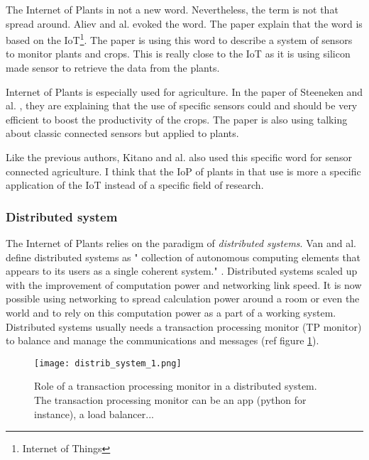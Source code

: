 The Internet of Plants in not a new word. Nevertheless, the term is not that spread around. Aliev and al. \cite{alievInternetPlantsApplication2018} evoked the word. The paper explain that the word is based on the IoT\footnote{Internet of Things}. The paper is using this word to describe a system of sensors to monitor plants and crops. This is really close to the IoT as it is using silicon made sensor to retrieve the data from the plants.

Internet of Plants is especially used for agriculture. In the paper of Steeneken and al. \cite{steenekenSensorsAgricultureInternet2023}, they are explaining that the use of specific sensors could and should be very efficient to boost the productivity of the crops.
The paper is also using talking about classic connected sensors but applied to plants.

Like the previous authors, Kitano and al. \cite{kitanoInternetPlantsIoP2022} also used this specific word for sensor connected agriculture. I think that the IoP of plants in that use is more a specific application of the IoT instead of a specific field of research.

\subsubsection{Distributed system}

The Internet of Plants relies on the paradigm of \textit{distributed systems}. Van and al. define distributed systems as " collection of autonomous computing elements that appears to its users as a single coherent system." \cite{steenDistributedSystems2017}.
Distributed systems scaled up with the improvement of computation power and networking link speed. It is now possible using networking to spread calculation power around a room or even the world and to rely on this computation power as a part of a working system. Distributed systems usually needs a transaction processing monitor (TP monitor) to balance and manage the communications and messages (ref figure \ref{fig:distrib_system_1}).

\begin{figure}[h!]
    \centering
    \texttt{[image: distrib\_system\_1.png]}
    \caption{Role of a transaction processing monitor in a distributed system. The transaction processing monitor can be an app (python for instance), a load balancer...}
    \vspace{0.1cm}
    \label{fig:distrib_system_1}
\end{figure}

